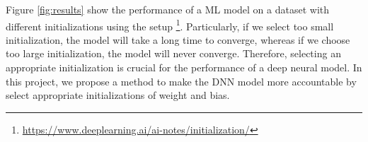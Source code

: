 Figure \ref{fig:results} show the performance of a ML model on a dataset with different initializations using the setup \footnote{\small \url{https://www.deeplearning.ai/ai-notes/initialization/}}. Particularly, if we select too small initialization, the model will take a long time to converge, whereas if we choose too large initialization, the model will never converge. Therefore, selecting an appropriate initialization is crucial for the performance of a deep neural model. In this project, we propose a method to make the DNN model more accountable by select appropriate initializations of weight and bias. 
%
%
%
%
%
